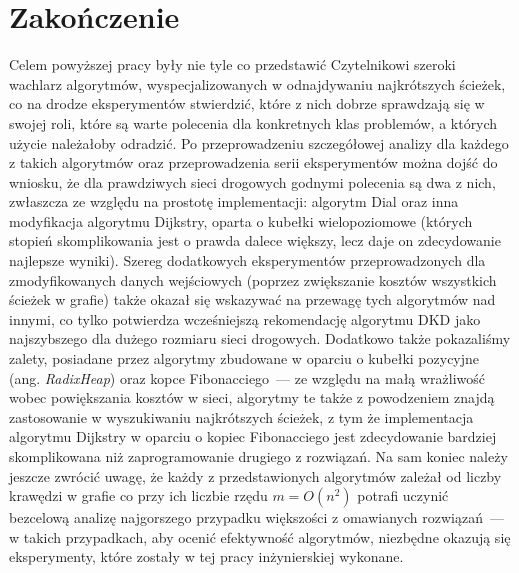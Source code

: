 \chapter{Zakończenie}

Celem powyższej pracy były nie tyle co przedstawić Czytelnikowi szeroki wachlarz algorytmów, wyspecjalizowanych w odnajdywaniu najkrótszych ścieżek, co na drodze eksperymentów stwierdzić, które z nich dobrze sprawdzają się w swojej roli, które są warte polecenia dla konkretnych klas problemów, a których użycie należałoby odradzić. Po przeprowadzeniu szczegółowej analizy dla każdego z takich algorytmów oraz przeprowadzenia serii eksperymentów można dojść do wniosku, że dla prawdziwych sieci drogowych godnymi polecenia są dwa z nich, zwłaszcza ze względu na prostotę implementacji: algorytm Dial oraz inna modyfikacja algorytmu Dijkstry, oparta o kubełki wielopoziomowe (których stopień skomplikowania jest o prawda dalece większy, lecz daje on zdecydowanie najlepsze wyniki). Szereg dodatkowych eksperymentów przeprowadzonych dla zmodyfikowanych danych wejściowych (poprzez zwiększanie kosztów wszystkich ścieżek w grafie) także okazał się wskazywać na przewagę tych algorytmów nad innymi, co tylko potwierdza wcześniejszą rekomendację algorytmu \textsc{DKD} jako najszybszego dla dużego rozmiaru sieci drogowych. Dodatkowo także pokazaliśmy zalety, posiadane przez algorytmy zbudowane w oparciu o kubełki pozycyjne (ang. \textit{RadixHeap}) oraz kopce Fibonacciego~--- ze względu na małą wrażliwość wobec powiększania kosztów w sieci, algorytmy te także z powodzeniem znajdą zastosowanie w wyszukiwaniu najkrótszych ścieżek, z tym że implementacja algorytmu Dijkstry w oparciu o kopiec Fibonacciego jest zdecydowanie bardziej skomplikowana niż zaprogramowanie drugiego z rozwiązań. Na sam koniec należy jeszcze zwrócić uwagę, że każdy z przedstawionych algorytmów zależał od liczby krawędzi w grafie co przy ich liczbie rzędu $m = O \left( n^2 \right)$ potrafi uczynić bezcelową analizę najgorszego przypadku większości z omawianych rozwiązań~--- w takich przypadkach, aby ocenić efektywność algorytmów, niezbędne okazują się eksperymenty, które zostały w tej pracy inżynierskiej wykonane.